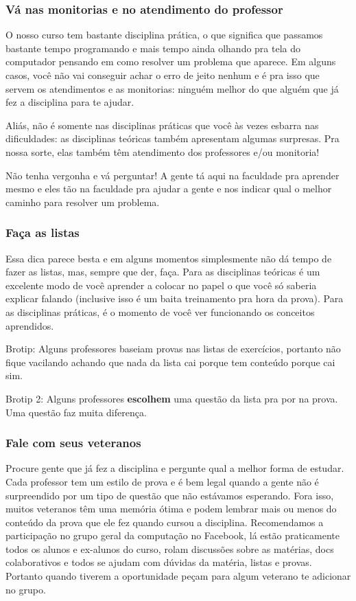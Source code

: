 \subsubsection{Vá nas monitorias e no atendimento do professor}
O nosso curso tem bastante disciplina prática, o que significa que passamos bastante tempo programando e mais tempo ainda olhando pra tela do computador pensando em como resolver um problema que aparece. Em alguns casos, você não vai conseguir achar o erro de jeito nenhum e é pra isso que servem os atendimentos e as monitorias: ninguém melhor do que alguém que já fez a disciplina para te ajudar.

Aliás, não é somente nas disciplinas práticas que você às vezes esbarra nas dificuldades: as disciplinas teóricas também apresentam algumas surpresas. Pra nossa sorte, elas também têm atendimento dos professores e/ou monitoria!

Não tenha vergonha e vá perguntar! A gente tá aqui na faculdade pra aprender mesmo e eles tão na faculdade pra ajudar a gente e nos indicar qual o melhor caminho para resolver um problema.

\subsubsection{Faça as listas}
Essa dica parece besta e em alguns momentos simplesmente não dá tempo de fazer as listas, mas, sempre que der, faça. Para as disciplinas teóricas é um excelente modo de você aprender a colocar no papel o que você só saberia explicar falando (inclusive isso é um baita treinamento pra hora da prova). Para as disciplinas práticas, é o momento de você ver funcionando os conceitos aprendidos.

Brotip: Alguns professores baseiam provas nas listas de exercícios, portanto não fique vacilando achando que nada da lista cai porque tem conteúdo porque cai sim.

Brotip 2: Alguns professores \textbf{escolhem} uma questão da lista pra por na prova. Uma questão faz muita diferença.

\subsubsection{Fale com seus veteranos}
Procure gente que já fez a disciplina e pergunte qual a melhor forma de estudar. Cada professor tem um estilo de prova e é bem legal quando a gente não é surpreendido por um tipo de questão que não estávamos esperando. Fora isso, muitos veteranos têm uma memória ótima e podem lembrar mais ou menos do conteúdo da prova que ele fez quando cursou a disciplina.
Recomendamos a participação no grupo geral da computação no Facebook, lá estão praticamente todos os alunos e ex-alunos do curso, rolam discussões sobre as matérias, docs colaborativos e todos se ajudam com dúvidas da matéria, listas e provas. Portanto quando tiverem a oportunidade peçam para algum veterano te adicionar no grupo.

